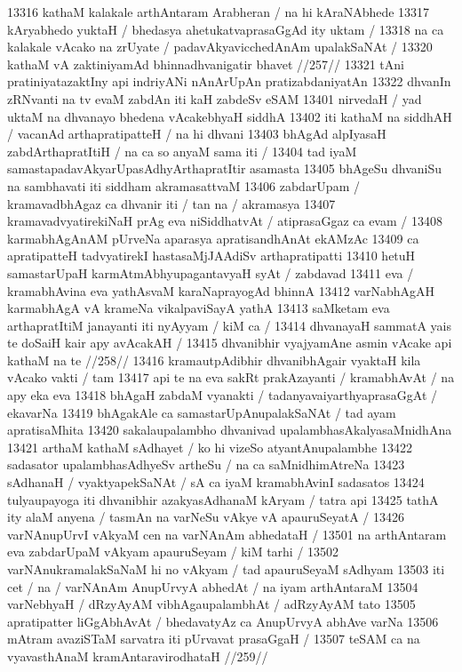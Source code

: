 13316 kathaM kalakale arthAntaram Arabheran / na hi kAraNAbhede  
13317 kAryabhedo yuktaH / bhedasya ahetukatvaprasaGgAd ity uktam / 
13318 na ca kalakale vAcako na zrUyate / padavAkyavicchedAnAm upalakSaNAt /
13320 	kathaM vA zaktiniyamAd bhinnadhvanigatir bhavet //257//
13321 tAni pratiniyatazaktIny api indriyANi nAnArUpAn pratizabdaniyatAn
13322 dhvanIn zRNvanti na tv evaM zabdAn iti kaH zabdeSv eSAM 
13401 nirvedaH / yad uktaM na dhvanayo bhedena vAcakebhyaH siddhA 
13402 iti kathaM na siddhAH / vacanAd arthapratipatteH / na hi dhvani 
13403 bhAgAd alpIyasaH zabdArthapratItiH / na ca so anyaM sama iti /  
13404 tad iyaM samastapadavAkyarUpasAdhyArthapratItir asamasta
13405 bhAgeSu dhvaniSu na sambhavati iti siddham akramasattvaM 
13406 zabdarUpam / kramavadbhAgaz ca dhvanir iti / tan na / akramasya 
13407 kramavadvyatirekiNaH prAg eva niSiddhatvAt / atiprasaGgaz ca evam / 
13408 karmabhAgAnAM pUrveNa aparasya apratisandhAnAt ekAMzAc 
13409 ca apratipatteH tadvyatirekI hastasaMjJAAdiSv arthapratipatti  
13410 hetuH samastarUpaH karmAtmAbhyupagantavyaH syAt / zabdavad 
13411 eva / kramabhAvina eva yathAsvaM karaNaprayogAd bhinnA  
13412 varNabhAgAH karmabhAgA vA krameNa vikalpaviSayA yathA 
13413 saMketam eva arthapratItiM janayanti iti nyAyyam / kiM ca /
13414 	dhvanayaH sammatA yais te doSaiH kair apy avAcakAH /  
13415 	dhvanibhir vyajyamAne asmin vAcake api kathaM na te //258//  
13416 kramautpAdibhir dhvanibhAgair vyaktaH kila vAcako vakti / tam  
13417 api te na eva sakRt prakAzayanti / kramabhAvAt / na apy eka eva 
13418 bhAgaH zabdaM vyanakti / tadanyavaiyarthyaprasaGgAt / ekavarNa  
13419 bhAgakAle ca samastarUpAnupalakSaNAt / tad ayam apratisaMhita 
13420 sakalaupalambho dhvanivad upalambhasAkalyasaMnidhAna
13421 arthaM kathaM sAdhayet / ko hi vizeSo atyantAnupalambhe 
13422 sadasator upalambhasAdhyeSv artheSu / na ca saMnidhimAtreNa 
13423 sAdhanaH / vyaktyapekSaNAt / sA ca iyaM kramabhAvinI sadasatos 
13424 tulyaupayoga iti dhvanibhir azakyasAdhanaM kAryam / tatra api
13425 tathA ity alaM anyena / tasmAn na varNeSu vAkye vA apauruSeyatA / 
13426 	varNAnupUrvI vAkyaM cen na varNAnAm abhedataH /
13501 na arthAntaram eva zabdarUpaM vAkyam apauruSeyam / kiM tarhi / 
13502 varNAnukramalakSaNaM hi no vAkyam / tad apauruSeyaM sAdhyam 
13503 iti cet / na / varNAnAm AnupUrvyA abhedAt / na iyam arthAntaraM
13504 varNebhyaH / dRzyAyAM vibhAgaupalambhAt / adRzyAyAM tato  
13505 apratipatter liGgAbhAvAt / bhedavatyAz ca AnupUrvyA abhAve varNa
13506 mAtram avaziSTaM sarvatra iti pUrvavat prasaGgaH / 
13507 	teSAM ca na vyavasthAnaM kramAntaravirodhataH //259//  
